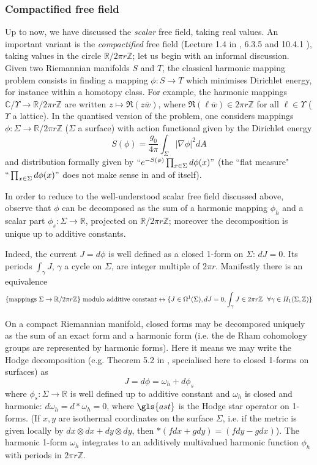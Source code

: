 \documentclass[10pt]{article}
\newcommand{\Z}{\mathbb{Z}}
\newcommand{\R}{\mathbb{R}}
\newcommand{\C}{\mathbb{C}}
\begin{document}
\subsubsection{Compactified free field}


Up to now, we have discussed the {\em scalar} free field, taking real values. An important variant is the {\em compactified} free field (Lecture 1.4 in \cite{Gaw_CFT}, 6.3.5 and 10.4.1 \cite{DiF}), taking values in the circle $\R/2\pi r\Z$; let us begin with an informal discussion. Given two Riemannian manifolds $S$ and $T$, the classical harmonic mapping problem consists in finding a mapping $\phi:S\rightarrow T$ which minimises Dirichlet energy, for instance within a homotopy class. For example, the harmonic mappings $\C/\Upsilon\rightarrow\R/2\pi r\Z$ are written $z\mapsto\Re(z\bar w)$, where $\Re(\ell\bar w)\in 2\pi r\Z$ for all $\ell\in \Upsilon$ ($\Upsilon$ a lattice). In the quantised version of the problem, one considers mappings $\phi:\Sigma\rightarrow\R/2\pi r\Z$ ($\Sigma$ a surface) with action functional given by the Dirichlet energy
$$S(\phi)=\frac {g_0}{4\pi}\int_\Sigma|\nabla\phi|^2dA$$ 
and distribution formally given by $``e^{-S(\phi)}\prod_{x\in\Sigma}d\phi(x)"$ (the ``flat measure" $``\prod_{x\in\Sigma}d\phi(x)"$ does not make sense in and of itself).

In order to reduce to the well-understood scalar free field discussed above, observe that $\phi$ can be decomposed as the sum of a harmonic mapping $\phi_h$ and a scalar part $\phi_s:\Sigma\rightarrow\R$, projected on $\R/2\pi r\Z$; moreover the decomposition is unique up to additive constants. 

Indeed, the current $J=d\phi$ is well defined as a closed 1-form on $\Sigma$: $dJ=0$. Its periods $\int_\gamma J$, $\gamma$ a cycle on $\Sigma$, are integer multiple of $2\pi r$. Manifestly there is an equivalence
\begin{align*}
\{{\rm mappings\ }\Sigma\rightarrow\R/2\pi r\Z\}{\rm\ modulo\ additive\ constant} \leftrightarrow
\{J\in\Omega^1(\Sigma), dJ=0, \int_\gamma J\in 2\pi r\Z{\rm\ \ }\forall\gamma\in H_1(\Sigma,\Z)\}
\end{align*}

On a compact Riemannian manifold, closed forms may be decomposed uniquely as the sum of an exact form and a harmonic form (i.e. the de Rham cohomology groups are represented by harmonic forms). Here it means we may write the Hodge decomposition (e.g. Theorem 5.2 in \cite{Voisin_Hodge}, specialised here to closed 1-forms on surfaces) as
\begin{equation}\label{eq:hodgedec}
J=d\phi=\omega_h+d\phi_s
\end{equation}
where $\phi_s:\Sigma\rightarrow\R$ is well defined up to additive constant and $\omega_h$ is closed and harmonic: $d\omega_h=d\ast\omega_h=0$, where $\gls{ast}$ is the Hodge star operator on 1-forms. (If $x,y$ are isothermal coordinates on the surface $\Sigma$, i.e. if the metric is given locally by $dx\otimes dx+dy\otimes dy$, then $\ast(fdx+gdy)=(fdy-gdx)$). The harmonic 1-form $\omega_h$ integrates to an additively multivalued harmonic function $\phi_h$ with periods in $2\pi r\Z$.
\end{document}
